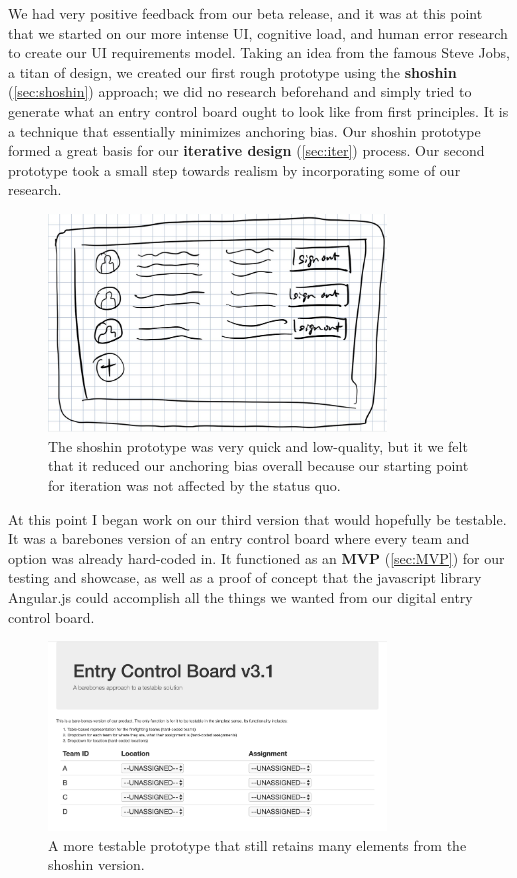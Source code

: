 \documentclass[a4paper,12pt]{article}
\begin{document}
We had very positive feedback from our beta release, and it was at this point that we started on our more intense UI, cognitive load, and human error research to create our UI requirements model. Taking an idea from the famous Steve Jobs, a titan of design, we created our first rough prototype using the \textbf{shoshin} (\ref{sec:shoshin}) approach; we did no research beforehand and simply tried to generate what an entry control board ought to look like from first principles. It is a technique that essentially minimizes anchoring bias. Our shoshin prototype formed a great basis for our \textbf{iterative design} (\ref{sec:iter}) process. Our second prototype took a small step towards realism by incorporating some of our research.

\begin{figure}[H]
\centering
\includegraphics[width=0.8\textwidth]{img/image017.png}
\caption{The shoshin prototype was very quick and low-quality, but it we felt that it reduced our anchoring bias overall because our starting point for iteration was not affected by the status quo.}
\label{}
\end{figure}

At this point I began work on our third version that would hopefully be testable. It was a barebones version of an entry control board where every team and option was already hard-coded in. It functioned as an \textbf{MVP} (\ref{sec:MVP}) for our testing and showcase, as well as a proof of concept that the javascript library Angular.js could accomplish all the things we wanted from our digital entry control board.

\begin{figure}[H]
\centering
\includegraphics[width=0.8\textwidth]{img/image018.png}
\caption{A more testable prototype that still retains many elements from the shoshin version.}
\label{}
\end{figure}
\end{document}
